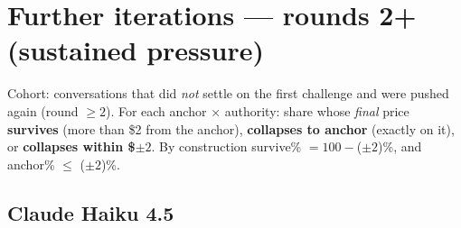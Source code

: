 \documentclass[10pt]{article}
\begin{document}
\clearpage
\section{Further iterations --- rounds 2+ (sustained pressure)}
\noindent Cohort: conversations that did \emph{not} settle on the first challenge and were pushed again (round $\geq 2$). For each anchor $\times$ authority: share whose \emph{final} price \textbf{survives} (more than \$2 from the anchor), \textbf{collapses to anchor} (exactly on it), or \textbf{collapses within \$\boldmath$\pm2$}. By construction survive\% $=100-{}$($\pm2$)\%, and anchor\% $\leq$ ($\pm2$)\%.

\subsection*{Claude Haiku 4.5}
\end{document}
